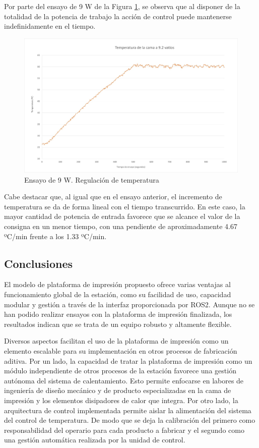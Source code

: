 Por parte del ensayo de 9 W de la Figura \ref{fig: Ensayo plataforma impresion 9 W}, se observa que al disponer de la totalidad de la potencia de trabajo la acción de control puede mantenerse indefinidamente en el tiempo. 

\begin{figure}[H]
    \centering
    \includegraphics[scale=0.15]{figuras/Ensayo plataforma impresion 9 W.jpeg}
    \caption{Ensayo de 9 W. Regulación de temperatura}
    \label{fig: Ensayo plataforma impresion 9 W}
\end{figure}

Cabe destacar que, al igual que en el ensayo anterior, el incremento de temperatura se da de forma lineal con el tiempo transcurrido. En este caso, la mayor cantidad de potencia de entrada favorece que se alcance el valor de la consigna en un menor tiempo, con una pendiente de aproximadamente 4.67 ºC/min frente a los 1.33 ºC/min. 

\subsection{Conclusiones}
El modelo de plataforma de impresión propuesto ofrece varias ventajas al funcionamiento global de la estación, como su facilidad de uso, capacidad modular y gestión a través de la interfaz proporcionada por ROS2. Aunque no se han podido realizar ensayos con la plataforma de impresión finalizada, los resultados indican que se trata de un equipo robusto y altamente flexible.

Diversos aspectos facilitan el uso de la plataforma de impresión como un elemento escalable para su implementación en otros procesos de fabricación aditiva. Por un lado, la capacidad de tratar la plataforma de impresión como un módulo independiente de otros procesos de la estación favorece una gestión autónoma del sistema de calentamiento. Esto permite enfocarse en labores de ingeniería de diseño mecánico y de producto especializadas en la cama de impresión y los elementos disipadores de calor que integra. Por otro lado, la arquitectura de control implementada permite aislar la alimentación del sistema del control de temperatura. De modo que se deja la calibración del primero como responsabilidad del operario para cada producto a fabricar y el segundo como una gestión automática realizada por la unidad de control.

